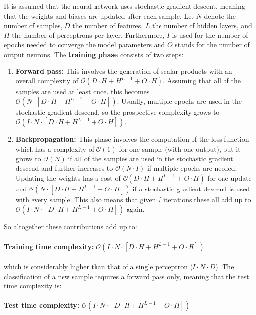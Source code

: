 \documentclass[paper=a4, fontsize=11pt]{scrartcl} %
\begin{document}
It is assumed that the neural network uses stochastic gradient descent, meaning that the weights and biases are updated after each sample.
Let $N$ denote the number of samples, $D$ the number of features, $L$ the number of hidden layers, and $H$ the number of perceptrons per layer. 
Furthermore, $I$ is used for the number of epochs needed to converge the model parameters and $O$ stands for the number of output neurons.
\noindent The \textbf{training phase} consists of two steps: 
\begin{enumerate}
	\item \textbf{Forward pass:}
	This involves the generation of scalar products with an overall complexity of $\mathcal{O}\left(D\cdot H + H^{L-1} + O\cdot H\right)$. 
	Assuming that all of the samples are used at least once, this becomes $\mathcal{O}\left(N\cdot \left[D\cdot H + H^{L-1} + O\cdot H\right]\right)$.
	Usually, multiple epochs are used in the stochastic gradient descend, so the prospective complexity grows to \\ $\mathcal{O}\left(I\cdot N\cdot \left[D\cdot H + H^{L-1} + O\cdot H\right]\right)$.
	\item \textbf{Backpropagation:}
	This phase involves the computation of the loss function which has a complexity of $\mathcal{O}(1)$ for one sample (with one output), but it grows to $\mathcal{O}(N)$ if all of the samples are used in the stochastic gradient descend and further increases to $\mathcal{O}(N\cdot I)$ if multiple epochs are needed.
	Updating the weights has a cost of $\mathcal{O}(D\cdot H+H^{L-1}+O \cdot H)$ for one update and $\mathcal{O}\left(N \cdot[D\cdot H+H^{L-1}+O \cdot H]\right)$ if a stochastic gradient descend is used with every sample.
	This also means that given $I$ iterations these all add up to $\mathcal{O}\left(I \cdot N \cdot[D\cdot H+H^{L-1}+O \cdot H]\right)$ again.
\end{enumerate}
So altogether these contributions add up to:
\\
\\
\textbf{Training time complexity:} $\mathcal{O}\left(I\cdot N\cdot [D\cdot H + H^{L-1} + O\cdot H]\right)$     
\\
\\ 
which is considerably higher than that of a single perceptron ($I\cdot N\cdot D$).
The classification of a new sample requires a forward pass only, meaning that the test time complexity is: 
\\
\\
\textbf{Test time complexity:} $\mathcal{O}\left(I\cdot N\cdot [D\cdot H + H^{L-1} + O\cdot H]\right)$
\end{document}
